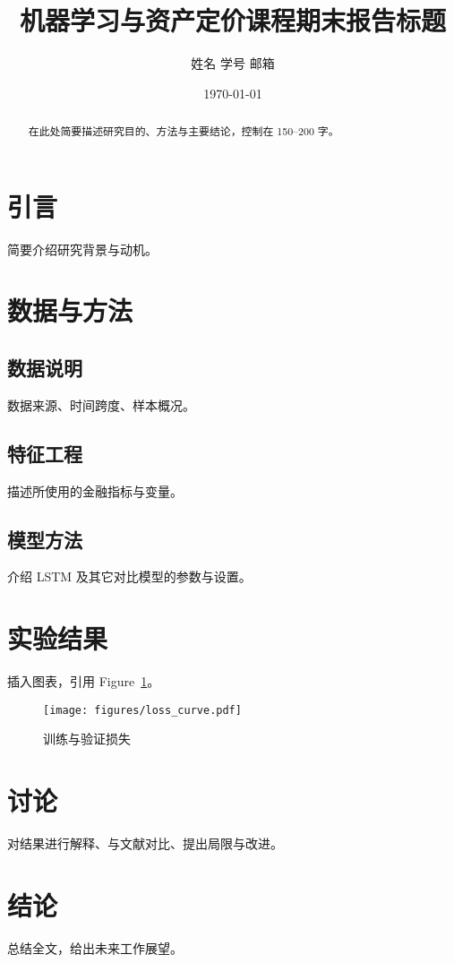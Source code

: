 \documentclass[11pt]{article}
\title{机器学习与资产定价课程\newline 期末报告标题}
\author{姓名 学号 邮箱}
\date{\today}
\begin{document}
\maketitle

\begin{abstract}
在此处简要描述研究目的、方法与主要结论，控制在 150--200 字。
\end{abstract}

\section{引言}
简要介绍研究背景与动机。

\section{数据与方法}
\subsection{数据说明}
数据来源、时间跨度、样本概况。

\subsection{特征工程}
描述所使用的金融指标与变量。

\subsection{模型方法}
介绍 LSTM 及其它对比模型的参数与设置。

\section{实验结果}
插入图表，引用 Figure~\ref{fig:loss}。

\begin{figure}[h]
    \centering
    \texttt{[image: figures/loss\_curve.pdf]}
    \caption{训练与验证损失}
    \label{fig:loss}
\end{figure}

\section{讨论}
对结果进行解释、与文献对比、提出局限与改进。

\section{结论}
总结全文，给出未来工作展望。



\end{document}
